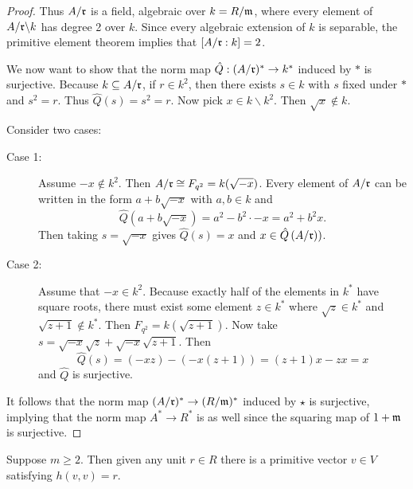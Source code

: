 \begin{proof}
Thus $A/\mathfrak{r}$ is a field, algebraic over $k = R/\mathfrak{m}$, where every element of $A/\mathfrak{r} \backslash k$ has degree 2 over $k$.
Since every algebraic extension of $k$ is separable, the primitive element theorem implies that $[A/\mathfrak{r} : k] = 2$.

We now want to show that the norm map $\hat{Q}: (A/\mathfrak{r})^* \to k^*$ induced by $*$ is surjective.
Because $k \subseteq A/\mathfrak{r}$, if $r \in k^2$, then there exists $s \in k$ with $s$ fixed under $*$ and $s^2 = r$.
Thus $\hat{Q}(s) = s^2 = r$.
Now pick $x \in k \backslash k^2$.
Then $\sqrt{x} \not\in k$.

Consider two cases:
\begin{description}
\item[Case 1:] Assume $-x \not\in k^2$. Then $A/\mathfrak{r} \cong F_{q^2} = k(\sqrt{-x})$.
Every element of $A/\mathfrak{r}$ can be written in the form $a + b \sqrt{-x}$ with $a, b \in k$ and 
\[
\hat{Q}(a + b \sqrt{-x}) = a^2 - b^2 \cdot -x = a^2 + b^2x.
\]
Then taking $s = \sqrt{-x}$ gives $\hat{Q}{(s)} = x$ and $x \in \hat{Q}\left(A/\mathfrak{r}\right))$.
\item[Case 2:] Assume that $-x \in k^2$.
Because exactly half of the elements in $k^*$ have square roots, there must exist some element $z \in k^*$ where $\sqrt{z} \in k^*$ and $\sqrt{z+1} \not\in k^*$.
Then $F_{q^2} = k(\sqrt{z+1})$.
Now take $s = \sqrt{-x}\sqrt{z} + \sqrt{-x}\sqrt{z+1}$.
Then
\[
\hat{Q}(s) = (-xz) - (-x(z+1)) = (z+1)x - zx = x
\]
and $\hat{Q}$ is surjective.
\end{description}
It follows that the norm map $(A/\mathfrak{r})^* \to (R/\mathfrak{m})^*$ induced by $\star$ is surjective, implying that the norm map $A^* \to R^*$ is as well since the squaring map of $1 + \mathfrak{m}$ is surjective.
\end{proof}


\begin{proposition}\label{prop3.4}
Suppose $m \ge 2$.
Then given any unit $r \in R$ there is a primitive vector $v \in V$ satisfying $h(v,v) = r$.
\end{proposition}

